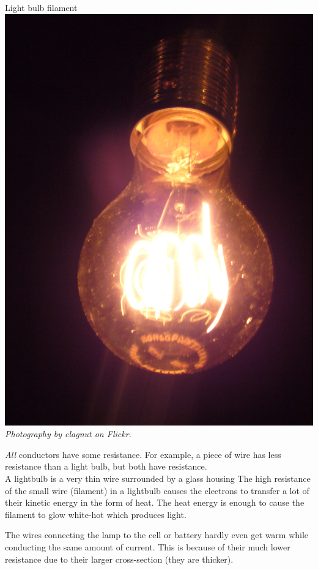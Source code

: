 
\begin{minipage}{.5\textwidth}
\begin{center}
Light bulb filament\\
\includegraphics[width=.55\textwidth]{photos/lightbulb_by_clagnut.jpg}\\
\textit{Photography by clagnut on Flickr.}
\end{center}  
\end{minipage}
\begin{minipage}{.5\textwidth}

\textit{All} conductors have some resistance. For example, a piece of wire
has less resistance than a light bulb, but both have resistance. \\

A lightbulb is a very thin wire surrounded by a glass housing The high resistance of the small wire (filament) in a lightbulb causes the electrons to 
transfer a lot of their kinetic energy in the form of heat. The heat energy is enough
to cause the filament to glow white-hot which produces light.

\end{minipage}

The wires
connecting the lamp to the cell or battery hardly even get warm while
conducting the same amount of current. This is because of their
much lower resistance due to their larger cross-section (they are thicker).

